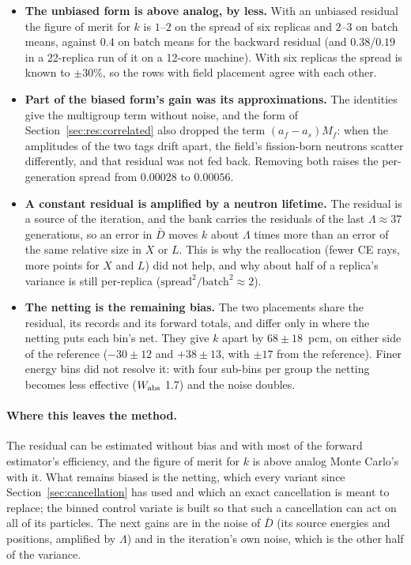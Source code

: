\begin{itemize}
\item \textbf{The unbiased form is above analog, by less.} With an unbiased residual the figure of merit
  for $k$ is $1$--$2$ on the spread of six replicas and $2$--$3$ on batch means, against $0.4$ on batch
  means for the backward residual (and $0.38$/$0.19$ in a 22-replica run of it on a 12-core machine).
  With six replicas the spread is known to $\pm30\%$, so the rows with field placement agree with each
  other.
\item \textbf{Part of the biased form's gain was its approximations.} The identities give the
  multigroup term without noise, and the form of Section~\ref{sec:res:correlated} also dropped the
  term $(a_f-a_s)M_f$: when the amplitudes of the two tags drift apart, the field's fission-born
  neutrons scatter differently, and that residual was not fed back. Removing both raises the
  per-generation spread from $0.00028$ to $0.00056$.
\item \textbf{A constant residual is amplified by a neutron lifetime.} The residual is a source of the
  iteration, and the bank carries the residuals of the last $\Lambda\approx37$ generations, so an error
  in $\bar D$ moves $k$ about $\Lambda$ times more than an error of the same relative size in $X$ or $L$.
  This is why the reallocation (fewer CE rays, more points for $X$ and $L$) did not help, and why
  about half of a replica's variance is still per-replica ($\text{spread}^2/\text{batch}^2\approx2$).
\item \textbf{The netting is the remaining bias.} The two placements share the residual, its records
  and its forward totals, and differ only in where the netting puts each bin's net. They give $k$
  apart by $68\pm18$~pcm, on either side of the reference ($-30\pm12$ and $+38\pm13$, with $\pm17$
  from the reference). Finer energy bins did not resolve it: with four sub-bins per group the netting
  becomes less effective ($W_{\mathrm{abs}}$ 1.7) and the noise doubles.
\end{itemize}

\paragraph{Where this leaves the method.} The residual can be estimated without bias and with most of
the forward estimator's efficiency, and the figure of merit for $k$ is above analog Monte Carlo's
with it. What remains biased is the netting, which every variant since Section~\ref{sec:cancellation}
has used and which an exact cancellation is meant to replace; the binned control variate is built so
that such a cancellation can act on all of its particles. The next gains are in the noise of
$\bar D$ (its source energies and positions, amplified by $\Lambda$) and in the iteration's own
noise, which is the other half of the variance.

